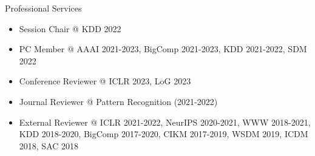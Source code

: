 \documentclass{resume} %
\makeatletter
\newcommand \Dotfill {\leavevmode \cleaders \hb@xt@ .99em{\hss .\hss }\hfill \kern \z@}
\makeatother
\begin{document}

\begin{rSection}{Professional Services}

\begin{itemize}[noitemsep, leftmargin=*]
	\item Session Chair @ KDD 2022 \smallskip
	\item PC Member @ AAAI 2021-2023, BigComp 2021-2023, KDD 2021-2022, SDM 2022 \smallskip
	\item Conference Reviewer @ ICLR 2023, LoG 2023 \smallskip
	\item Journal Reviewer @ Pattern Recognition  (2021-2022) \smallskip
	\item External Reviewer @ ICLR 2021-2022, NeurIPS 2020-2021, WWW 2018-2021, KDD 2018-2020, BigComp 2017-2020, CIKM 2017-2019, WSDM 2019, ICDM 2018, SAC 2018
\end{itemize}

\end{rSection}


\begin{comment}
\begin{rSection}{Software Developments}

Gold Farming Group Detection System in MMORPG (w/ NCSOFT) \smallskip \Dotfill \emph{Sep. 2020 - Feb. 2021} \\ 
DL-based Recommender System in E-commerce (w/ Wemakeprice) \smallskip \Dotfill \emph{Feb. 2019 - Dec. 2019} \\ 
Feature Selection Method for RNN Recommender Systems (w/ SK Telecom) \smallskip \Dotfill \emph{Mar. 2018 - Nov. 2018} \\ 
Temporal Stock Price Prediction System (w/ eMoney) \smallskip \Dotfill \emph{Aug. 2017 - Feb. 2018} \\ 
Temporal Video Recommender System (w/ SK Broadband) \smallskip \Dotfill \emph{Nov. 2016 - Jun. 2017} \\ 
Distributed ML Library on Apache Spark (w/ SK Telecom) \smallskip \Dotfill \emph{Mar. 2016 - Jan. 2017}

\end{rSection}
\end{comment}
\end{document}
